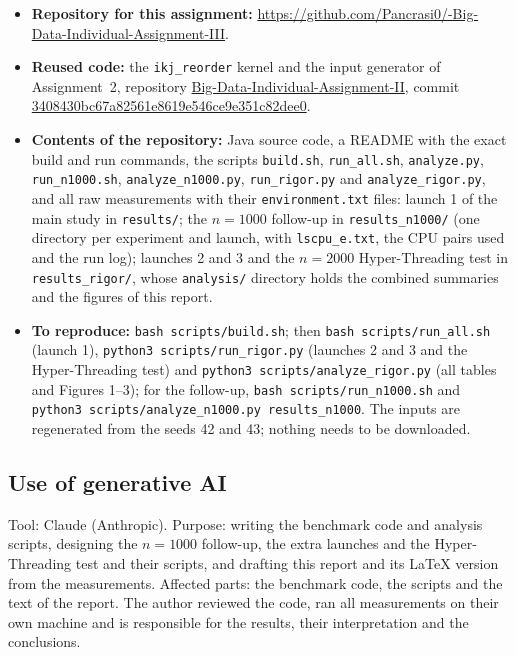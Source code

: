 \documentclass[11pt,a4paper]{article}
\newcommand{\code}[1]{\texttt{#1}}
\begin{document}
\begin{itemize}
  \item \textbf{Repository for this assignment:} \url{https://github.com/Pancrasi0/-Big-Data-Individual-Assignment-III}.
  \item \textbf{Reused code:} the \code{ikj\_reorder} kernel and the input generator of Assignment~2, repository \href{https://github.com/Pancrasi0/Big-Data-Individual-Assignment-II}{Big-Data-Individual-Assignment-II}, commit \url{3408430bc67a82561e8619e546ce9e351c82dee0}.
  \item \textbf{Contents of the repository:} Java source code, a README with the exact build and run commands, the scripts \code{build.sh}, \code{run\_all.sh}, \code{analyze.py}, \code{run\_n1000.sh}, \code{analyze\_n1000.py}, \code{run\_rigor.py} and \code{analyze\_rigor.py}, and all raw measurements with their \code{environment.txt} files: launch 1 of the main study in \code{results/}; the $n = 1000$ follow-up in \code{results\_n1000/} (one directory per experiment and launch, with \code{lscpu\_e.txt}, the CPU pairs used and the run log); launches 2 and 3 and the $n = 2000$ Hyper-Threading test in \code{results\_rigor/}, whose \code{analysis/} directory holds the combined summaries and the figures of this report.
  \item \textbf{To reproduce:} \code{bash scripts/build.sh}; then \code{bash scripts/run\_all.sh} (launch 1), \code{python3 scripts/run\_rigor.py} (launches 2 and 3 and the Hyper-Threading test) and \code{python3 scripts/analyze\_rigor.py} (all tables and Figures 1--3); for the follow-up, \code{bash scripts/run\_n1000.sh} and \code{python3 scripts/analyze\_n1000.py results\_n1000}. The inputs are regenerated from the seeds 42 and 43; nothing needs to be downloaded.
\end{itemize}

\subsection*{Use of generative AI}

Tool: Claude (Anthropic). Purpose: writing the benchmark code and analysis scripts, designing the $n = 1000$ follow-up, the extra launches and the Hyper-Threading test and their scripts, and drafting this report and its \LaTeX{} version from the measurements. Affected parts: the benchmark code, the scripts and the text of the report. The author reviewed the code, ran all measurements on their own machine and is responsible for the results, their interpretation and the conclusions.
\end{document}
